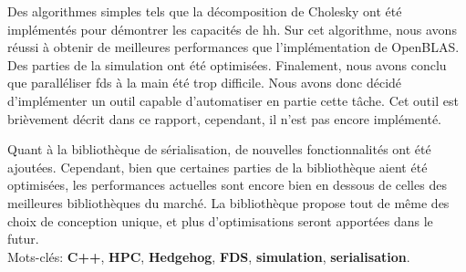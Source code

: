 Des algorithmes simples tels que la décomposition de Cholesky ont été
implémentés pour démontrer les capacités de \gls{hh}. Sur cet algorithme, nous
avons réussi à obtenir de meilleures performances que l'implémentation de
OpenBLAS. Des parties de la simulation ont été optimisées. Finalement, nous
avons conclu que paralléliser \gls{fds} à la main été trop difficile. Nous avons
donc décidé d'implémenter un outil capable d'automatiser en partie cette tâche.
Cet outil est brièvement décrit dans ce rapport, cependant, il n'est pas encore
implémenté.

Quant à la bibliothèque de sérialisation, de nouvelles fonctionnalités ont été
ajoutées. Cependant, bien que certaines parties de la bibliothèque aient été
optimisées, les performances actuelles sont encore bien en dessous de celles des
meilleures bibliothèques du marché. La bibliothèque propose tout de même des
choix de conception unique, et plus d'optimisations seront apportées dans le
futur.\\

Mots-clés: \textbf{C++}, \textbf{HPC}, \textbf{Hedgehog}, \textbf{FDS},
\textbf{simulation}, \textbf{serialisation}.
